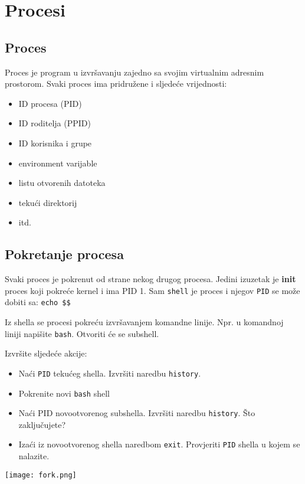 \section*{Procesi}
\subsection*{Proces}
Proces je program u izvršavanju zajedno sa svojim virtualnim adresnim prostorom. Svaki proces ima pridružene i sljedeće vrijednosti:
\begin{itemize}
 \item ID procesa (PID)
 \item ID roditelja (PPID)
 \item ID korisnika i grupe
 \item environment varijable
 \item listu otvorenih datoteka
 \item tekući direktorij
 \item itd.
\end{itemize}
\subsection*{Pokretanje procesa}
Svaki proces je pokrenut od strane nekog drugog procesa. Jedini izuzetak je \textbf{init} proces koji pokreće kernel i ima PID 1. Sam \texttt{shell} je proces i njegov \texttt{PID} se može dobiti sa: \texttt{echo \$\$}

Iz shella se procesi pokreću izvršavanjem komandne linije. Npr. u komandnoj liniji napišite \texttt{bash}. Otvoriti će se subshell. 

\begin{zadatak} Izvršite sljedeće akcije:
\begin{itemize} 
 \item Naći \texttt{PID} tekućeg shella. Izvršiti naredbu \texttt{history}.
 \item Pokrenite novi \texttt{bash} shell
 \item Naći PID novootvorenog subshella. Izvršiti naredbu \texttt{history}. Što zaključujete?
 \item Izaći iz novootvorenog shella naredbom \texttt{exit}. Provjeriti \texttt{PID} shella u kojem se nalazite. 
\end{itemize}
  
\end{zadatak}
\begin{center} 
\texttt{[image: fork.png]}%
\end{center}

